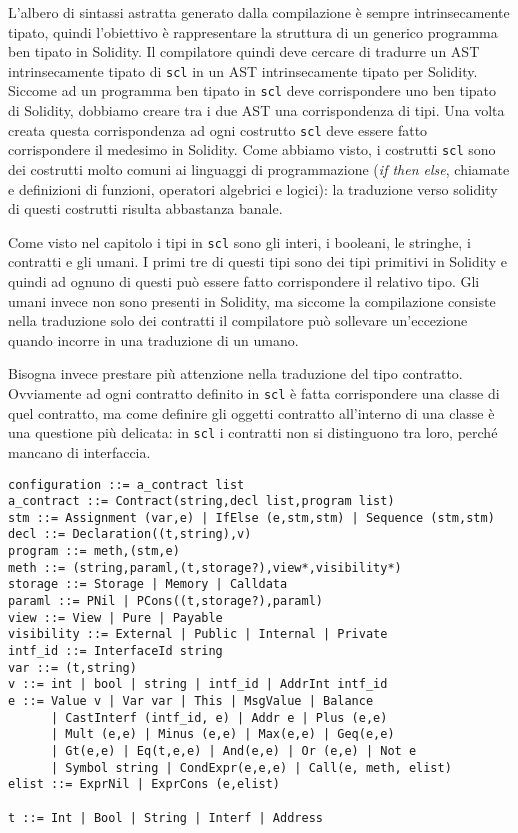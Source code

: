 \documentclass[12pt,a4paper]{report}
\begin{document}
L'albero di sintassi astratta generato dalla compilazione è sempre
intrinsecamente tipato, quindi l'obiettivo è rappresentare la struttura
di un generico programma ben tipato in Solidity. Il compilatore quindi
deve cercare di tradurre un AST intrinsecamente tipato di \texttt{scl}
in un AST intrinsecamente tipato per Solidity. Siccome ad un programma
ben tipato in \texttt{scl} deve corrispondere uno ben tipato di
Solidity, dobbiamo creare tra i due AST una corrispondenza di tipi. Una
volta creata questa corrispondenza ad ogni costrutto \texttt{scl} deve
essere fatto corrispondere il medesimo in Solidity. Come abbiamo visto,
i costrutti \texttt{scl} sono dei costrutti molto comuni ai linguaggi di
programmazione (\emph{if then else}, chiamate e definizioni di funzioni,
operatori algebrici e logici): la traduzione verso solidity di questi
costrutti risulta abbastanza banale.

Come visto nel capitolo i tipi in \texttt{scl} sono gli interi, i
booleani, le stringhe, i contratti e gli umani. I primi tre di questi
tipi sono dei tipi primitivi in Solidity e quindi ad ognuno di questi
può essere fatto corrispondere il relativo tipo. Gli umani invece non
sono presenti in Solidity, ma siccome la compilazione consiste nella
traduzione solo dei contratti il compilatore può sollevare un'eccezione
quando incorre in una traduzione di un umano.

Bisogna invece prestare più attenzione nella traduzione del tipo
contratto. Ovviamente ad ogni contratto definito in \texttt{scl} è fatta
corrispondere una classe di quel contratto, ma come definire gli oggetti
contratto all'interno di una classe è una questione più delicata: in
\texttt{scl} i contratti non si distinguono tra loro, perché mancano di
interfaccia.

\begin{verbatim}
configuration ::= a_contract list
a_contract ::= Contract(string,decl list,program list)
stm ::= Assignment (var,e) | IfElse (e,stm,stm) | Sequence (stm,stm)
decl ::= Declaration((t,string),v)
program ::= meth,(stm,e)
meth ::= (string,paraml,(t,storage?),view*,visibility*)
storage ::= Storage | Memory | Calldata 
paraml ::= PNil | PCons((t,storage?),paraml)
view ::= View | Pure | Payable
visibility ::= External | Public | Internal | Private
intf_id ::= InterfaceId string
var ::= (t,string)
v ::= int | bool | string | intf_id | AddrInt intf_id
e ::= Value v | Var var | This | MsgValue | Balance 
      | CastInterf (intf_id, e) | Addr e | Plus (e,e) 
      | Mult (e,e) | Minus (e,e) | Max(e,e) | Geq(e,e)
      | Gt(e,e) | Eq(t,e,e) | And(e,e) | Or (e,e) | Not e 
      | Symbol string | CondExpr(e,e,e) | Call(e, meth, elist)
elist ::= ExprNil | ExprCons (e,elist)

t ::= Int | Bool | String | Interf | Address
\end{verbatim}
\end{document}
